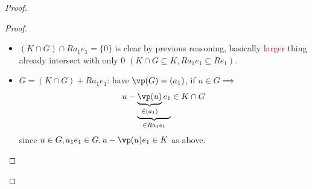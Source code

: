 \begin{proof}
\begin{enumerate}
		      \begin{proof}
			      \leavevmode
			      \begin{itemize}
				      \item \( (K \cap G) \cap R a_1 e_1 = \{0\} \) is clear by previous reasoning, basically
				            \textcolor{red}{larger} thing already intersect with only \( 0 \) \( (K \cap G \subseteq K, Ra_1
				            e_1 \subseteq R e_1) \).
				      \item \( G = (K \cap G) + R a_1 e_1 \): have \( \vp(G) = (a_1) \), if \( u \in G \implies  \)
				            \[
					            u - \underbrace{\underbrace{\vp(u)}_{\in (a_1)}e_1}_{\in R a_1 e_1} \in K \cap G
				            \]
				            since \( u \in G, a_1 e_1 \in G, u - \vp(u)e_1 \in K \) as above.
			      \end{itemize}

		      \end{proof}


\end{enumerate}
\end{proof}
